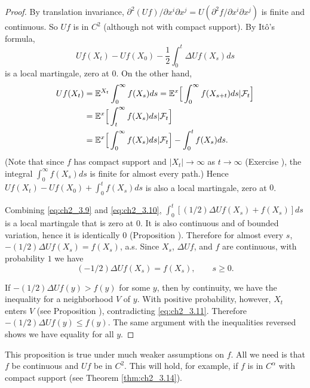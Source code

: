 \begin{proof}
By translation invariance, $\partial^2(Uf)/\partial x^i\partial x^j = U(\partial^2 f/\partial x^i\partial x^j)$ is finite and continuous. So $Uf$ is in $C^2$ (although not with compact support). By It\^o's formula,
\begin{equation}\label{eq:ch2_3.9}
    Uf(X_t) - Uf(X_0) - \frac{1}{2}\int_0^t \Delta Uf(X_s)ds
\end{equation}
is a local martingale, zero at $0$. On the other hand,
\begin{align}\label{eq:ch2_3.10}
    Uf(X_t) &= \mathbb{E}^{X_t}\int_0^\infty f(X_s)ds = \mathbb{E}^x\Big[\int_0^\infty f(X_{s+t})ds| \mathcal{F}_t\Big] \\
    &= \mathbb{E}^x\Big[\int_t^\infty f(X_s)ds| \mathcal{F}_t\Big] \notag \\
    &= \mathbb{E}^x\Big[\int_0^\infty f(X_s)ds| \mathcal{F}_t\Big] - \int_0^t f(X_s)ds. \notag
\end{align}
(Note that since $f$ has compact support and $|X_t| \to \infty$ as $t \to \infty$ (Exercise ), the integral $\int_0^\infty f(X_s)ds$ is finite for almost every path.) Hence $Uf(X_t) - Uf(X_0) + \int_0^t f(X_s)ds$ is also a local martingale, zero at $0$.

Combining \eqref{eq:ch2_3.9} and \eqref{eq:ch2_3.10}, $\int_0^t[(1/2)\Delta Uf(X_s) + f(X_s)]ds$ is a local martingale that is zero at $0$. It is also continuous and of bounded variation, hence it is identically $0$ (Proposition ). Therefore for almost every $s$, $-(1/2)\Delta Uf(X_s) = f(X_s)$, a.s. Since $X_s$, $\Delta Uf$, and $f$ are continuous, with probability $1$ we have
\begin{equation}\label{eq:ch2_3.11}
    (-1/2)\Delta Uf(X_s) = f(X_s), \qquad s \geq 0.
\end{equation}

If $-(1/2)\Delta Uf(y) > f(y)$ for some $y$, then by continuity, we have the inequality for a neighborhood $V$ of $y$. With positive probability, however, $X_t$ enters $V$ (see Proposition ), contradicting \eqref{eq:ch2_3.11}. Therefore $-(1/2)\Delta Uf(y) \leq f(y)$. The same argument with the inequalities reversed shows we have equality for all $y$.
\end{proof}


This proposition is true under much weaker assumptions on $f$. All we need is that $f$ be continuous and $Uf$ be in $C^2$. This will hold, for example, if $f$ is in $C^\alpha$ with compact support (see Theorem \ref{thm:ch2_3.14}).

